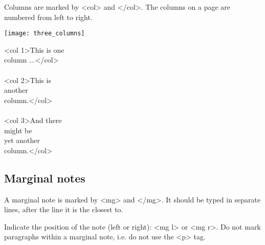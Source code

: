 \begin{mainrule}
Columns are marked by <col> and </col>. The columns on a page are numbered from left to right.
\end{mainrule}

\begin{example}

\texttt{[image: three\_columns]} 

\begin{typeLatin}
<col 1>This is one \\
column ...</col> \\ \\
<col 2>This is \\
another \\
column.</col> \\ \\
<col 3>And there \\
might be \\
yet another \\
column.</col> \\
\end{typeLatin}

\end{example}



\subsection{Marginal notes}

\begin{mainrule}
A marginal note is marked by <mg> and </mg>. It should be typed in separate lines, after the line it is the closest to. 
\end{mainrule}

\begin{clarification}
Indicate the position of the note (left or right): <mg l> or <mg r>. Do not mark paragraphs within a marginal note, i.e. do not use the <p> tag.
\end{clarification}


